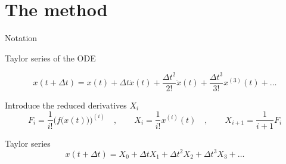 \documentclass{beamer}
\begin{document}
\section{The method}

\frame{\tableofcontents[currentsection]}

\begin{frame}[fragile]{Notation}

Taylor series of the ODE

$$x(t+\Delta t) = x(t) + \Delta t \dot{x}(t) + \frac{\Delta t^2}{2!} \ddot{x}(t) + \frac{\Delta t^3}{3!} x^{(3)}(t) + \dots$$

Introduce the reduced derivatives $X_i$
$$
F_i = \frac{1}{i!} \Big( f \big(x(t) \big) \Big)^{(i)}
\quad , \quad \quad
 X_i = \frac{1}{i!} x^{(i)}(t) 
\quad , \quad \quad
X_{i+1} = \frac{1}{i+1} F_{i}
$$

Taylor series
$$
x(t + \Delta t ) = X_0 + \Delta t X_1 + \Delta t^2 X_2 + \Delta t^3 X_3 + \dots 
$$

\end{frame}
\end{document}
